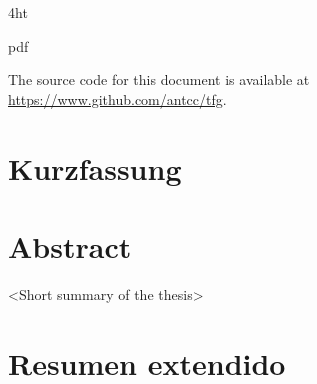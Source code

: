 \documentclass[
  fontsize=12pt,
  a4paper,  %
  twoside,  %
  bibliography=totoc,
  headsepline,
  cleardoublepage=empty,
  draft=false
]{scrbook}
\theoremstyle{nonumberplain}
\begin{document}

\frontmatter
\iftex4ht
  \Configure{$}{\PicMath}{\EndPicMath}{}

  {pdf}
  {%
  }
\fi


\Coverpage

\setlength{\parindent}{1.5em}
\linespread{1.1}

\pagestyle{empty}
\renewcommand*{\chapterpagestyle}{empty}
\pagebreak
\hspace{0pt}
\vfill
\begin{center}
    \begin{minipage}[t]{12.5cm}
        \doclicenseThis
        The source code for this document is available at \url{https://www.github.com/antcc/tfg}.
    \end{minipage}
\end{center}
\vfill
\hspace{0pt}
\pagebreak
\cleardoublepage


\pagestyle{preamble}
\renewcommand*{\chapterpagestyle}{preamble}



\ifdeutsch
  \section*{Kurzfassung}
\else
  \section*{Abstract}
\fi

<Short summary of the thesis>

\cleardoublepage

\section*{Resumen extendido}
\end{document}
